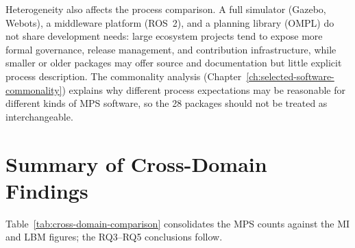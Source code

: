Heterogeneity also affects the process comparison. A full simulator (Gazebo, Webots), a middleware platform (ROS~2), and a planning library (OMPL) do not share development needs: large ecosystem projects tend to expose more formal governance, release management, and contribution infrastructure, while smaller or older packages may offer source and documentation but little explicit process description. The commonality analysis (Chapter~\ref{ch:selected-software-commonality}) explains why different process expectations may be reasonable for different kinds of MPS software, so the 28 packages should not be treated as interchangeable.

\section{Summary of Cross-Domain Findings}
\label{sec:cross-domain-summary}

Table~\ref{tab:cross-domain-comparison} consolidates the MPS counts against the MI and LBM figures; the RQ3--RQ5 conclusions follow.

